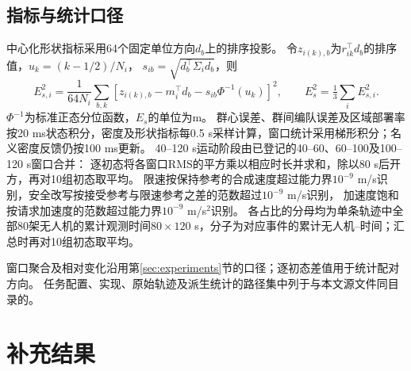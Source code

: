 \documentclass[UTF8,a4paper,11pt,fontset=none]{ctexart}
\begin{document}
\subsection{指标与统计口径}\label{app:metrics}
中心化形状指标采用64个固定单位方向$d_b$上的排序投影。
令$z_{i(k),b}$为$r_{ik}^\top d_b$的排序值，$u_k=(k-1/2)/N_i$，
$s_{ib}=\sqrt{d_b^\top\Sigma_i d_b}$，则
\[
E_{s,i}^2=\frac1{64N_i}\sum_{b,k}
\left[z_{i(k),b}-m_i^\top d_b-s_{ib}\Phi^{-1}(u_k)\right]^2,
\qquad E_s^2=\tfrac13\sum_iE_{s,i}^2.
\]
$\Phi^{-1}$为标准正态分位函数，$E_s$的单位为m。
群心误差、群间编队误差及区域部署率按20 ms状态积分，密度及形状指标每0.5 s采样计算，窗口统计采用梯形积分；名义密度反馈仍按100 ms更新。
40--120 s运动阶段由已登记的40--60、60--100及100--120 s窗口合并：
逐初态将各窗口RMS的平方乘以相应时长并求和，除以80 s后开方，再对10组初态取平均。
限速按保持参考的合成速度超过能力界$10^{-9}$ m/s识别，安全改写按接受参考与限速参考之差的范数超过$10^{-9}$ m/s识别，
加速度饱和按请求加速度的范数超过能力界$10^{-9}$ m/s$^2$识别。
各占比的分母均为单条轨迹中全部80架无人机的累计观测时间$80\times120$ s，分子为对应事件的累计无人机--时间；汇总时再对10组初态取平均。

窗口聚合及相对变化沿用第\ref{sec:experiments}节的口径；逐初态差值用于统计配对方向。
任务配置、实现、原始轨迹及派生统计的路径集中列于与本文源文件同目录的。

\section{补充结果}\label{app:supplement}
\end{document}
